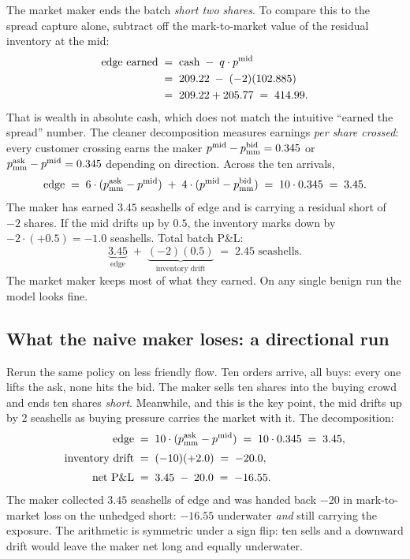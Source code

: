 The market maker ends the batch \emph{short two shares}. To compare
this to the spread capture alone, subtract off the mark-to-market
value of the residual inventory at the mid:
\begin{align}
  \text{edge earned}
  \;&=\; \text{cash} \;-\; q \cdot p^{\mathrm{mid}} \\
  \;&=\; 209.22 \;-\; (-2)(102.885) \\
  \;&=\; 209.22 + 205.77 \;=\; 414.99. \label{eq:ch8_edge_mismatch}
\end{align}
That is wealth in absolute cash, which does not match the intuitive
``earned the spread'' number. The cleaner decomposition measures
earnings \emph{per share crossed}: every customer crossing earns the
maker $p^{\mathrm{mid}} - p^{\mathrm{bid}}_{\mathrm{mm}} = 0.345$ or $p^{\mathrm{ask}}_{\mathrm{mm}}
- p^{\mathrm{mid}} = 0.345$ depending on direction. Across the ten arrivals,
\begin{equation}
  \text{edge} \;=\; 6 \cdot (p^{\mathrm{ask}}_{\mathrm{mm}} - p^{\mathrm{mid}})
           \;+\; 4 \cdot (p^{\mathrm{mid}} - p^{\mathrm{bid}}_{\mathrm{mm}})
  \;=\; 10 \cdot 0.345 \;=\; 3.45.
  \label{eq:ch8_edge}
\end{equation}
The maker has earned $3.45$ seashells of edge and is carrying a
residual short of $-2$ shares. If the mid drifts up by $0.5$, the
inventory marks down by $-2 \cdot (+0.5) = -1.0$ seashells. Total
batch P\&L:
\begin{equation}
  \underbrace{3.45}_{\text{edge}}
  \;+\; \underbrace{(-2)(0.5)}_{\text{inventory drift}}
  \;=\; 2.45 \text{ seashells}.
  \label{eq:ch8_benign_net}
\end{equation}
The market maker keeps most of what they earned. On any single
benign run the model looks fine.

\subsection{What the naive maker loses: a directional run}
\label{subsec:naive_bad}

Rerun the same policy on less friendly flow. Ten orders arrive, all
buys: every one lifts the ask, none hits the bid. The maker sells
ten shares into the buying crowd and ends ten shares \emph{short}.
Meanwhile, and this is the key point, the mid drifts up by $2$
seashells as buying pressure carries the market with it. The decomposition:
\begin{align}
  \text{edge}
  \;&=\; 10 \cdot (p^{\mathrm{ask}}_{\mathrm{mm}} - p^{\mathrm{mid}})
  \;=\; 10 \cdot 0.345 \;=\; 3.45, \\[0.25em]
  \text{inventory drift}
  \;&=\; (-10)(+2.0) \;=\; -20.0, \\[0.25em]
  \text{net P\&L}
  \;&=\; 3.45 \;-\; 20.0 \;=\; -16.55. \label{eq:ch8_bad_net}
\end{align}
The maker collected $3.45$ seashells of edge and was handed back
$-20$ in mark-to-market loss on the unhedged short: $-16.55$
underwater \emph{and} still carrying the exposure. The arithmetic
is symmetric under a sign flip: ten sells and a downward drift would
leave the maker net long and equally underwater.

